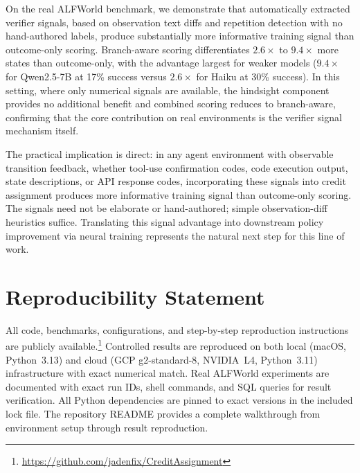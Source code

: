\documentclass[11pt]{article}
\begin{document}
On the real ALFWorld benchmark, we demonstrate that automatically extracted verifier signals, based on observation text diffs and repetition detection with no hand-authored labels, produce substantially more informative training signal than outcome-only scoring. Branch-aware scoring differentiates $2.6\times$ to $9.4\times$ more states than outcome-only, with the advantage largest for weaker models ($9.4\times$ for Qwen2.5-7B at 17\% success versus $2.6\times$ for Haiku at 30\% success). In this setting, where only numerical signals are available, the hindsight component provides no additional benefit and combined scoring reduces to branch-aware, confirming that the core contribution on real environments is the verifier signal mechanism itself.

The practical implication is direct: in any agent environment with observable transition feedback, whether tool-use confirmation codes, code execution output, state descriptions, or API response codes, incorporating these signals into credit assignment produces more informative training signal than outcome-only scoring. The signals need not be elaborate or hand-authored; simple observation-diff heuristics suffice. Translating this signal advantage into downstream policy improvement via neural training represents the natural next step for this line of work.

\section*{Reproducibility Statement}

All code, benchmarks, configurations, and step-by-step reproduction instructions are publicly available.\footnote{\url{https://github.com/jadenfix/CreditAssignment}} Controlled results are reproduced on both local (macOS, Python~3.13) and cloud (GCP g2-standard-8, NVIDIA~L4, Python~3.11) infrastructure with exact numerical match. Real ALFWorld experiments are documented with exact run IDs, shell commands, and SQL queries for result verification. All Python dependencies are pinned to exact versions in the included lock file. The repository README provides a complete walkthrough from environment setup through result reproduction.
\end{document}

